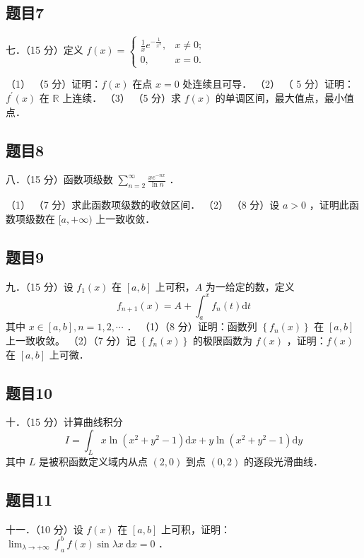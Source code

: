 \documentclass{article}
\begin{document}
\subsection{题目7}
七．（15 分）定义 \(f(x)= \begin{cases}\frac{1}{x} e^{-\frac{1}{x^{2}}}, & x \neq 0 ; \\ 0, & x=0 .\end{cases}\)

（1） （5 分）证明：\(f(x)\) 在点 \(x=0\) 处连续且可导．
（2） （ 5 分）证明：\(f^{\prime}(x)\) 在 \(\mathbb{R}\) 上连续．
（3） （5 分）求 \(f(x)\) 的单调区间，最大值点，最小值点．

\subsection{题目8}
八．（15 分）函数项级数 \(\sum_{n=2}^{\infty} \frac{x e^{-n x}}{\ln n}\) ．

（1） （7 分）求此函数项级数的收敛区间．
（2） （8 分）设 \(a>0\) ，证明此函数项级数在 \([a,+\infty)\) 上一致收敛．

\subsection{题目9}
九．（15 分）设 \(f_{1}(x)\) 在 \([a, b]\) 上可积，\(A\) 为一给定的数，定义
\[
f_{n+1}(x)=A+\int_{a}^{x} f_{n}(t) \mathrm{d} t
\]
其中 \(x \in[a, b], n=1,2, \cdots\) ．
（1）（8 分）证明：函数列 \(\left\{f_{n}(x)\right\}\) 在 \([a, b]\) 上一致收敛。
（2）（7 分）记 \(\left\{f_{n}(x)\right\}\) 的极限函数为 \(f(x)\) ，证明：\(f(x)\) 在 \([a, b]\) 上可微．

\subsection{题目10}
十．（15 分）计算曲线积分
\[
I=\int_{L} x \ln \left(x^{2}+y^{2}-1\right) \mathrm{d} x+y \ln \left(x^{2}+y^{2}-1\right) \mathrm{d} y
\]
其中 \(L\) 是被积函数定义域内从点 \((2,0)\) 到点 \((0,2)\) 的逐段光滑曲线．

\subsection{题目11}
十一．（10 分）设 \(f(x)\) 在 \([a, b]\) 上可积，证明： \(\lim _{\lambda \rightarrow+\infty} \int_{a}^{b} f(x) \sin \lambda x \mathrm{~d} x=0\) ．
\end{document}
